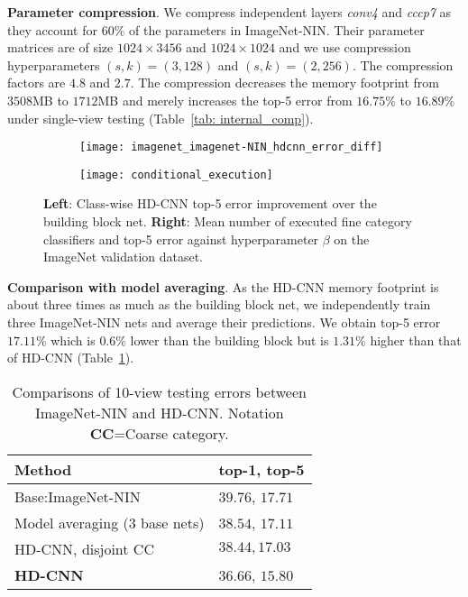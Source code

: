 \documentclass[10pt,twocolumn,letterpaper]{article}
\begin{document}
\noindent \textbf{Parameter compression}. We compress independent layers \textit{conv4} and \textit{cccp7} as they account for $60\%$ of the parameters in ImageNet-NIN. Their parameter matrices are of size $1024\times 3456$ and $1024\times 1024$ and we use compression hyperparameters $(s,k)=(3,128)$ and $(s,k)=(2,256)$. The compression factors are $4.8$ and $2.7$. The compression decreases the memory footprint from $3508$MB to $1712$MB and merely increases the top-5 error from $16.75\%$ to $16.89\%$ under single-view testing (Table~\ref{tab: internal_comp}).

\begin{figure}[h]
\vspace{-0.5em}
\centering
\begin{subfigure}{.23\textwidth}
  \centering
  \texttt{[image: imagenet\_imagenet-NIN\_hdcnn\_error\_diff]}
\end{subfigure}\begin{subfigure}{.27\textwidth}
  \centering
  \texttt{[image: conditional\_execution]}
\end{subfigure}
\caption{\textbf{Left}: Class-wise HD-CNN top-5 error improvement over the building block net. \textbf{Right}: Mean number of executed fine category classifiers and top-5 error against hyperparameter $\beta$ on the ImageNet validation dataset.}
\vspace{-1em}
\label{fig:coarse_category_nin_imagenet_conditional_exe}
\end{figure}

\noindent \textbf{Comparison with model averaging}. As the HD-CNN memory footprint is about three times as much as the building block net, we independently train three ImageNet-NIN nets and average their predictions. We obtain top-5 error $17.11\%$ which is $0.6\%$ lower than the building block but is $1.31\%$ higher than that of HD-CNN (Table~\ref{tab: imagenet_accuracy_imagenet_nin}).

{\renewcommand{\arraystretch}{1.2}\begin{table}[t]
\vspace{-1.0em}
\caption{Comparisons of 10-view testing errors between ImageNet-NIN and HD-CNN. Notation \textbf{CC}=Coarse category.}
\vspace{-1.5em}
\label{tab: imagenet_accuracy_imagenet_nin} 
\begin{center}
    \begin{tabular}{ p{4.3cm} |p{2.8cm}}
    Method & top-1, top-5 \\
    \hline\hline
    Base:ImageNet-NIN & $39.76$, $17.71$ \\ \hline
    Model averaging ($3$ base nets) &  $38.54$, $17.11$ \\ \hline  
	HD-CNN, disjoint CC &  $38.44, 17.03$  \\ \hline      
    \textbf{HD-CNN} &  $\mathbf{36.66}$, $\mathbf{15.80}$ \\ \hline    
    \end{tabular}   
\end{center}
\vspace{-1.5em}
\end{table}
}
\end{document}
